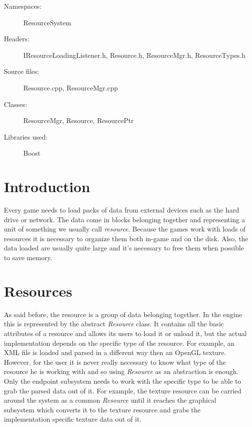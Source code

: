 \begin{description}
  \item[Namespaces:] ResourceSystem
  \item[Headers:] IResourceLoadingListener.h, Resource.h, ResourceMgr.h, Re\-sour\-ce\-Ty\-pes.h
  \item[Source files:] Resource.cpp, ResourceMgr.cpp
  \item[Classes:] ResourceMgr, Resource, ResourcePtr
  \item[Libraries used:] Boost
\end{description}

\section{Introduction}

Every game needs to load packs of data from external devices such as the hard drive or network. The data come in blocks belonging together and representing a unit of something we usually call \emph{resource}. Because the games work with loads of resources it is necessary to organize them both in-game and on the disk. Also, the data loaded are usually quite large and it's necessary to free them when possible to save memory.


\section{Resources}
As said before, the resource is a group of data belonging together. In the engine this is represented by the abstract \emph{Resource} class. It contains all the basic attributes of a resource and allows its users to load it or unload it, but the actual implementation depends on the specific type of the resource. For example, an XML file is loaded and parsed in a different way then an OpenGL texture. However, for the user it is never really necessary to know what type of the resource he is working with and so using \emph{Resource} as an abstraction is enough. Only the endpoint subsystem needs to work with the specific type to be able to grab the parsed data out of it. For example, the texture resource can be carried around the system as a common \emph{Resource} until it reaches the graphical subsystem which converts it to the texture resource and grabs the implementation specific texture data out of it.

